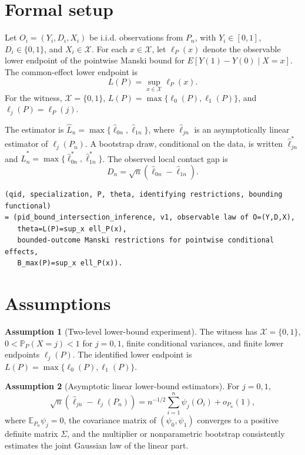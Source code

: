 \documentclass[11pt]{article}
\newcommand{\E}{\mathbb{E}}
\renewcommand{\Pr}{\mathbb{P}}
\theoremstyle{definition}
\newtheorem{assumption}{Assumption}
\theoremstyle{plain}
\theoremstyle{remark}
\begin{document}
\section{Formal setup}
Let \(O_i=(Y_i,D_i,X_i)\) be i.i.d. observations from \(P_n\), with \(Y_i\in[0,1]\), \(D_i\in\{0,1\}\), and \(X_i\in\mathcal X\). For each \(x\in\mathcal X\), let \(\ell_P(x)\) denote the observable lower endpoint of the pointwise Manski bound for \(E[Y(1)-Y(0)\mid X=x]\). The common-effect lower endpoint is
\[
L(P)=\sup_{x\in\mathcal X}\ell_P(x).
\]
For the witness, \(\mathcal X=\{0,1\}\), \(L(P)=\max\{\ell_0(P),\ell_1(P)\}\), and \(\ell_j(P)=\ell_P(j)\).

The estimator is \(\widehat L_n=\max\{\widehat\ell_{0n},\widehat\ell_{1n}\}\), where \(\widehat\ell_{jn}\) is an asymptotically linear estimator of \(\ell_j(P_n)\). A bootstrap draw, conditional on the data, is written \(\widehat\ell_{jn}^\ast\) and \(\widehat L_n^\ast=\max\{\widehat\ell_{0n}^\ast,\widehat\ell_{1n}^\ast\}\). The observed local contact gap is
\[
D_n=\sqrt n(\widehat\ell_{0n}-\widehat\ell_{1n}).
\]

\begin{verbatim}
(qid, specialization, P, theta, identifying restrictions, bounding functional)
= (pid_bound_intersection_inference, v1, observable law of O=(Y,D,X),
   theta=L(P)=sup_x ell_P(x),
   bounded-outcome Manski restrictions for pointwise conditional effects,
   B_max(P)=sup_x ell_P(x)).
\end{verbatim}

\section{Assumptions}
\begin{assumption}[Two-level lower-bound experiment]\label{ass:two-level}
The witness has \(\mathcal X=\{0,1\}\), \(0<\Pr_P(X=j)<1\) for \(j=0,1\), finite conditional variances, and finite lower endpoints \(\ell_j(P)\). The identified lower endpoint is \(L(P)=\max\{\ell_0(P),\ell_1(P)\}\).
\end{assumption}

\begin{assumption}[Asymptotic linear lower-bound estimators]\label{ass:al}
For \(j=0,1\),
\[
\sqrt n(\widehat\ell_{jn}-\ell_j(P_n))
=n^{-1/2}\sum_{i=1}^n\psi_j(O_i)+o_{P_n}(1),
\]
where \(\E_{P_n}\psi_j=0\), the covariance matrix of \((\psi_0,\psi_1)\) converges to a positive definite matrix \(\Sigma\), and the multiplier or nonparametric bootstrap consistently estimates the joint Gaussian law of the linear part.
\end{assumption}
\end{document}
